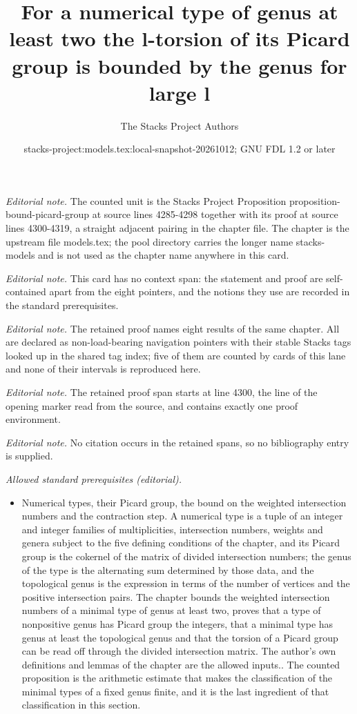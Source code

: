 \documentclass[10pt,a4paper]{amsart}
\title{For a numerical type of genus at least two the l-torsion of its Picard group is bounded by the genus for large l}
\author{The Stacks Project Authors}
\date{stacks-project:models.tex:local-snapshot-20261012; GNU FDL 1.2 or later}
\theoremstyle{plain}
\theoremstyle{definition}
\theoremstyle{remark}
\numberwithin{equation}{subsection}
\begin{document}
\maketitle
\noindent\textit{Editorial note.} The counted unit is the Stacks Project Proposition proposition-bound-picard-group at source lines 4285-4298 together with its proof at source lines 4300-4319, a straight adjacent pairing in the chapter file. The chapter is the upstream file models.tex; the pool directory carries the longer name stacks-models and is not used as the chapter name anywhere in this card.\par\medskip
\noindent\textit{Editorial note.} This card has no context span: the statement and proof are self-contained apart from the eight pointers, and the notions they use are recorded in the standard prerequisites.\par\medskip
\noindent\textit{Editorial note.} The retained proof names eight results of the same chapter. All are declared as non-load-bearing navigation pointers with their stable Stacks tags looked up in the shared tag index; five of them are counted by cards of this lane and none of their intervals is reproduced here.\par\medskip
\noindent\textit{Editorial note.} The retained proof span starts at line 4300, the line of the opening marker read from the source, and contains exactly one proof environment.\par\medskip
\noindent\textit{Editorial note.} No citation occurs in the retained spans, so no bibliography entry is supplied.\par\medskip
\noindent\textit{Allowed standard prerequisites (editorial).}\begin{itemize}
\item Numerical types, their Picard group, the bound on the weighted intersection numbers and the contraction step. A numerical type is a tuple of an integer and integer families of multiplicities, intersection numbers, weights and genera subject to the five defining conditions of the chapter, and its Picard group is the cokernel of the matrix of divided intersection numbers; the genus of the type is the alternating sum determined by those data, and the topological genus is the expression in terms of the number of vertices and the positive intersection pairs. The chapter bounds the weighted intersection numbers of a minimal type of genus at least two, proves that a type of nonpositive genus has Picard group the integers, that a minimal type has genus at least the topological genus and that the torsion of a Picard group can be read off through the divided intersection matrix. The author's own definitions and lemmas of the chapter are the allowed inputs.. The counted proposition is the arithmetic estimate that makes the classification of the minimal types of a fixed genus finite, and it is the last ingredient of that classification in this section.
\end{itemize}\medskip
\end{document}
